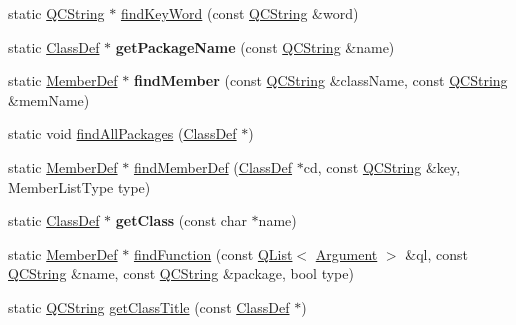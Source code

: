 \begin{DoxyCompactItemize}
\item 
static \mbox{\hyperlink{class_q_c_string}{Q\+C\+String}} $\ast$ \mbox{\hyperlink{class_vhdl_doc_gen_a0338d8a473042e0ce824cd33def75544}{find\+Key\+Word}} (const \mbox{\hyperlink{class_q_c_string}{Q\+C\+String}} \&word)
\item 
\mbox{\label{class_vhdl_doc_gen_ad890048820909df255f6ee3f95d6ed80}} 
static \mbox{\hyperlink{class_class_def}{Class\+Def}} $\ast$ {\bfseries get\+Package\+Name} (const \mbox{\hyperlink{class_q_c_string}{Q\+C\+String}} \&name)
\item 
\mbox{\label{class_vhdl_doc_gen_ac10fcedd625d329dc0013ee40e8546a7}} 
static \mbox{\hyperlink{class_member_def}{Member\+Def}} $\ast$ {\bfseries find\+Member} (const \mbox{\hyperlink{class_q_c_string}{Q\+C\+String}} \&class\+Name, const \mbox{\hyperlink{class_q_c_string}{Q\+C\+String}} \&mem\+Name)
\item 
static void \mbox{\hyperlink{class_vhdl_doc_gen_a00216e37afbb1841a9631a80379b7f0a}{find\+All\+Packages}} (\mbox{\hyperlink{class_class_def}{Class\+Def}} $\ast$)
\item 
static \mbox{\hyperlink{class_member_def}{Member\+Def}} $\ast$ \mbox{\hyperlink{class_vhdl_doc_gen_a69d1010e9addd89076e51cb78ddf029f}{find\+Member\+Def}} (\mbox{\hyperlink{class_class_def}{Class\+Def}} $\ast$cd, const \mbox{\hyperlink{class_q_c_string}{Q\+C\+String}} \&key, Member\+List\+Type type)
\item 
\mbox{\label{class_vhdl_doc_gen_ac766b60a818a192ef5492bcee794a0ea}} 
static \mbox{\hyperlink{class_class_def}{Class\+Def}} $\ast$ {\bfseries get\+Class} (const char $\ast$name)
\item 
static \mbox{\hyperlink{class_member_def}{Member\+Def}} $\ast$ \mbox{\hyperlink{class_vhdl_doc_gen_aded31b275385b372f3bb0d4182dd990e}{find\+Function}} (const \mbox{\hyperlink{class_q_list}{Q\+List}}$<$ \mbox{\hyperlink{struct_argument}{Argument}} $>$ \&ql, const \mbox{\hyperlink{class_q_c_string}{Q\+C\+String}} \&name, const \mbox{\hyperlink{class_q_c_string}{Q\+C\+String}} \&package, bool type)
\item 
static \mbox{\hyperlink{class_q_c_string}{Q\+C\+String}} \mbox{\hyperlink{class_vhdl_doc_gen_ad5d4c791af3f2943467c7c7af558d83a}{get\+Class\+Title}} (const \mbox{\hyperlink{class_class_def}{Class\+Def}} $\ast$)
\item 

\end{DoxyCompactItemize}
